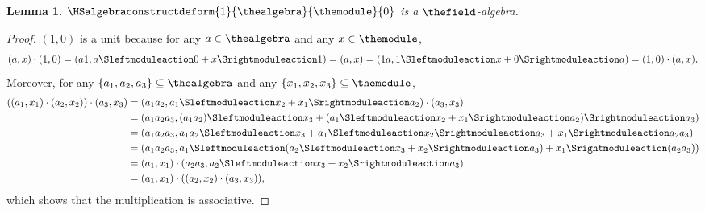 \documentclass[pdftex]{sigma}
\numberwithin{equation}{section}
\newtheorem{Lemma}[Theorem]{Lemma}
\begin{document}
{{
  \newcommand{\thedeform}{c}
  \newcommand{\anyelement}{a}
  \newcommand{\firstelement}{a_1}
      \newcommand{\secondelement}{a_2}
      \newcommand{\thirdelement}{a_3}
  \newcommand{\thedeformxx}[2]{c(#1 \Smonoidalproduct #2)}
  \begin{Lemma}
    \label{lemma:the-bfg-algebra}
     $\HSalgebraconstructdeform{1}{\thealgebra}{\themodule}{0}$ is a $\thefield$-algebra.
  \end{Lemma}
  \begin{proof}
      \newcommand{\somea}{a}
      \newcommand{\somex}{x}
      \newcommand{\firsta}{a_1}
      \newcommand{\seconda}{a_2}
      \newcommand{\thirda}{a_3}
      \newcommand{\firstx}{x_1}
      \newcommand{\secondx}{x_2}
      \newcommand{\thirdx}{x_3}
$(1,0)$ is a unit because for any $\somea\in\thealgebra$ and any $\somex\in\themodule$,
      \[
        (\somea,\somex)\cdot(1,0)=(\somea 1, \somea\Sleftmoduleaction 0+\somex\Srightmoduleaction 1)=(\somea , \somex)= (1 \somea , 1\Sleftmoduleaction \somex+0\Srightmoduleaction \somea)=  (1,0)\cdot(\somea,\somex).
      \]
 Moreover, for any $\{\firsta,\seconda,\thirda\}\subseteq \thealgebra$ and any $\{\firstx,\secondx,\thirdx\}\subseteq \themodule$,
      \begin{align*}
        ((\firsta,\firstx)\cdot (\seconda,\secondx))\cdot(\thirda,\thirdx)
      &{}=(\firsta\seconda,\firsta\Sleftmoduleaction\secondx+\firstx\Srightmoduleaction\seconda)\cdot (\thirda,\thirdx)\\
        &{}=(\firsta\seconda\thirda,(\firsta\seconda)\Sleftmoduleaction\thirdx+(\firsta\Sleftmoduleaction\secondx+\firstx\Srightmoduleaction\seconda)\Srightmoduleaction\thirda)\\        &{}=(\firsta\seconda\thirda,\firsta\seconda\Sleftmoduleaction\thirdx+\firsta\Sleftmoduleaction\secondx\Srightmoduleaction\thirda+\firstx\Srightmoduleaction\seconda\thirda) \\        &{}=(\firsta\seconda\thirda,\firsta\Sleftmoduleaction(\seconda\Sleftmoduleaction\thirdx+\secondx\Srightmoduleaction\thirda)+\firstx\Srightmoduleaction(\seconda\thirda))\\
        &{}=  (\firsta,\firstx)\cdot(\seconda\thirda,\seconda\Sleftmoduleaction\thirdx+\secondx\Srightmoduleaction\thirda)\\
        &{}= (\firsta,\firstx)\cdot ((\seconda,\secondx)\cdot(\thirda,\thirdx)),
\end{align*}
which shows that the multiplication is associative.
  \end{proof}
  }

}
\end{document}
